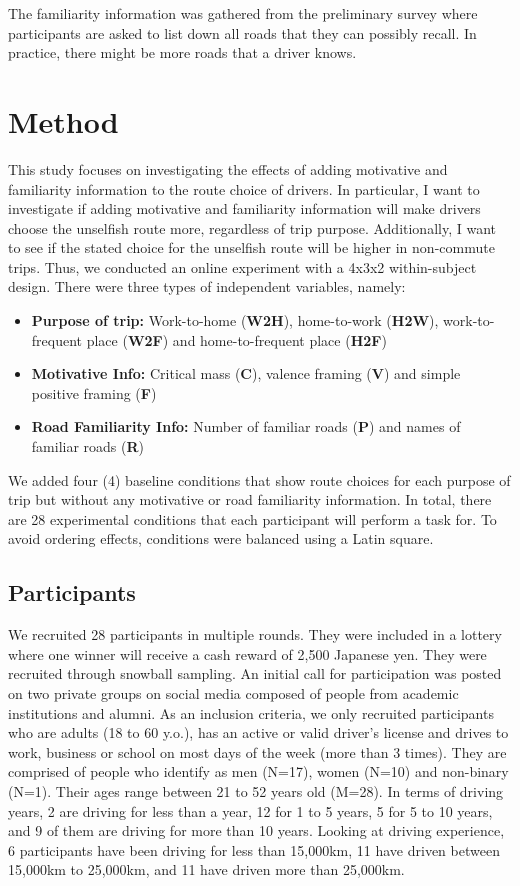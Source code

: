 The familiarity information was gathered from the preliminary survey where participants are asked to list down all roads that they can possibly recall. In practice, there might be more roads that a driver knows. 

\section{Method}
This study focuses on investigating the effects of adding motivative and familiarity information to the route choice of drivers. In particular, I want to investigate if adding motivative and familiarity information will make drivers choose the unselfish route more, regardless of trip purpose. Additionally, I want to see if the stated choice for the unselfish route will be higher in non-commute trips. Thus, we conducted an online experiment with a 4x3x2 within-subject design. There were three types of independent variables, namely:
\begin{itemize}
    \item \textbf{Purpose of trip:} Work-to-home (\textbf{W2H}), home-to-work (\textbf{H2W}), work-to-frequent place (\textbf{W2F}) and home-to-frequent place (\textbf{H2F})
    \item \textbf{Motivative Info:} Critical mass (\textbf{C}), valence framing (\textbf{V}) and simple positive framing (\textbf{F})
    \item \textbf{Road Familiarity Info:} Number of familiar roads (\textbf{P}) and names of familiar roads (\textbf{R})
\end{itemize}

We added four (4) baseline conditions that show route choices for each purpose of trip but without any motivative or road familiarity information. In total, there are 28 experimental conditions that each participant will perform a task for. To avoid ordering effects, conditions were balanced using a Latin square.

\subsection{Participants}
We recruited 28 participants in multiple rounds. They were included in a lottery where one winner will receive a cash reward of 2,500 Japanese yen. They were recruited through snowball sampling. An initial call for participation was posted on two private groups on social media composed of people from academic institutions and alumni. As an inclusion criteria, we only recruited participants who are adults (18 to 60 y.o.), has an active or valid driver's license and drives to work, business or school on most days of the week (more than 3 times). They are comprised of people who identify as men (N=17), women (N=10) and non-binary (N=1). Their ages range between 21 to 52 years old (M=28). In terms of driving years, 2 are driving for less than a year, 12 for 1 to 5 years, 5 for 5 to 10 years, and 9 of them are driving for more than 10 years. Looking at driving experience, 6 participants have been driving for less than 15,000km, 11 have driven between 15,000km to 25,000km, and 11 have driven more than 25,000km. 

